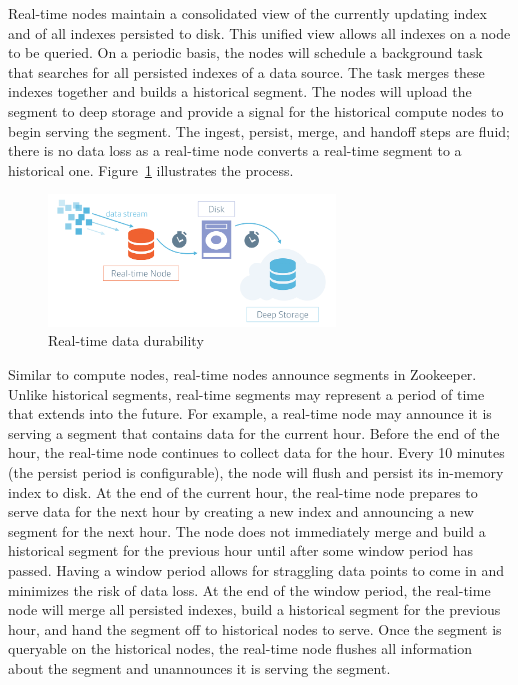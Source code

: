 \documentclass{vldb}
\begin{document}
Real-time nodes maintain a consolidated view of the currently updating
index and of all indexes persisted to disk. This unified view allows
all indexes on a node to be queried. On a periodic basis, the nodes will
schedule a background task that searches for all persisted indexes of
a data source. The task merges these indexes together and builds a
historical segment. The nodes will upload the segment to deep storage
and provide a signal for the historical compute nodes to begin serving
the segment. The ingest, persist, merge, and handoff steps are fluid;
there is no data loss as a real-time node converts a real-time segment
to a historical one. Figure~\ref{fig:data-durability} illustrates the process.

\begin{figure}
\centering
\includegraphics[width = 3in]{druid_realtime_flow}
\caption{Real-time data durability}
\label{fig:data-durability}
\end{figure}

Similar to compute nodes, real-time nodes announce segments in
Zookeeper. Unlike historical segments, real-time segments may
represent a period of time that extends into the future. For example,
a real-time node may announce it is serving a segment that contains
data for the current hour. Before the end of the hour, the real-time
node continues to collect data for the hour. Every 10 minutes (the
persist period is configurable), the node will flush and persist its
in-memory index to disk. At the end of the current hour, the real-time
node prepares to serve data for the next hour by creating a new index
and announcing a new segment for the next hour. The node does not
immediately merge and build a historical segment for the previous hour
until after some window period has passed. Having a window period
allows for straggling data points to come in and minimizes the risk of
data loss. At the end of the window period, the real-time node will
merge all persisted indexes, build a historical segment for the
previous hour, and hand the segment off to historical nodes to
serve. Once the segment is queryable on the historical nodes, the
real-time node flushes all information about the segment and
unannounces it is serving the segment.
\end{document}

